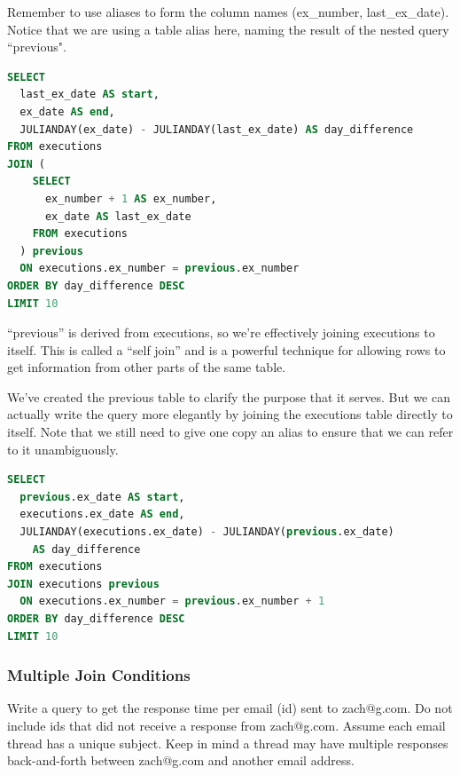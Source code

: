 \documentclass{article}
\begin{document}
Remember to use aliases to form the column names (ex\_number, last\_ex\_date). Notice that we are using a table alias here, naming the result of the nested query ``previous".

\vspace{8pt} \begin{lstlisting}[language=SQL]
SELECT
  last_ex_date AS start,
  ex_date AS end,
  JULIANDAY(ex_date) - JULIANDAY(last_ex_date) AS day_difference
FROM executions
JOIN (
    SELECT
      ex_number + 1 AS ex_number,
      ex_date AS last_ex_date
    FROM executions
  ) previous
  ON executions.ex_number = previous.ex_number
ORDER BY day_difference DESC
LIMIT 10
\end{lstlisting} \vspace{8pt}

``previous'' is derived from executions, so we’re effectively joining executions to itself. This is called a ``self join” and is a powerful technique for allowing rows to get information from other parts of the same table.

We've created the previous table to clarify the purpose that it serves. But we can actually write the query more elegantly by joining the executions table directly to itself. Note that we still need to give one copy an alias to ensure that we can refer to it unambiguously.

\vspace{8pt} \begin{lstlisting}[language=SQL]
SELECT
  previous.ex_date AS start,
  executions.ex_date AS end,
  JULIANDAY(executions.ex_date) - JULIANDAY(previous.ex_date)
    AS day_difference
FROM executions
JOIN executions previous
  ON executions.ex_number = previous.ex_number + 1
ORDER BY day_difference DESC
LIMIT 10
\end{lstlisting} \vspace{8pt}

\subsubsection{Multiple Join Conditions}

Write a query to get the response time per email (id) sent to zach@g.com. Do not include ids that did not receive a response from zach@g.com. Assume each email thread has a unique subject. Keep in mind a thread may have multiple responses back-and-forth between zach@g.com and another email address. 
\end{document}

